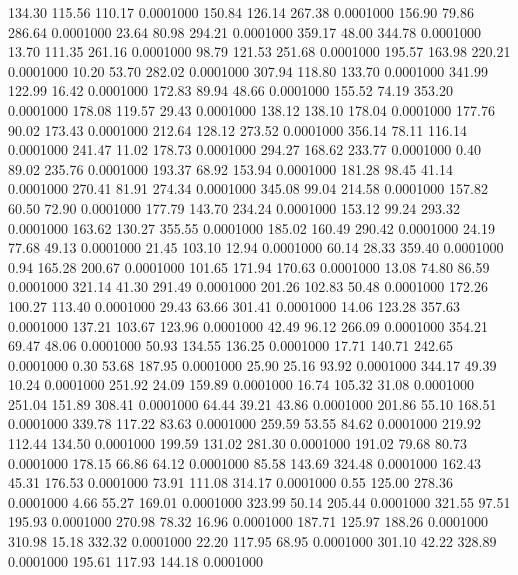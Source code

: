  134.30  115.56  110.17   0.0001000
 150.84  126.14  267.38   0.0001000
 156.90   79.86  286.64   0.0001000
  23.64   80.98  294.21   0.0001000
 359.17   48.00  344.78   0.0001000
  13.70  111.35  261.16   0.0001000
  98.79  121.53  251.68   0.0001000
 195.57  163.98  220.21   0.0001000
  10.20   53.70  282.02   0.0001000
 307.94  118.80  133.70   0.0001000
 341.99  122.99   16.42   0.0001000
 172.83   89.94   48.66   0.0001000
 155.52   74.19  353.20   0.0001000
 178.08  119.57   29.43   0.0001000
 138.12  138.10  178.04   0.0001000
 177.76   90.02  173.43   0.0001000
 212.64  128.12  273.52   0.0001000
 356.14   78.11  116.14   0.0001000
 241.47   11.02  178.73   0.0001000
 294.27  168.62  233.77   0.0001000
   0.40   89.02  235.76   0.0001000
 193.37   68.92  153.94   0.0001000
 181.28   98.45   41.14   0.0001000
 270.41   81.91  274.34   0.0001000
 345.08   99.04  214.58   0.0001000
 157.82   60.50   72.90   0.0001000
 177.79  143.70  234.24   0.0001000
 153.12   99.24  293.32   0.0001000
 163.62  130.27  355.55   0.0001000
 185.02  160.49  290.42   0.0001000
  24.19   77.68   49.13   0.0001000
  21.45  103.10   12.94   0.0001000
  60.14   28.33  359.40   0.0001000
   0.94  165.28  200.67   0.0001000
 101.65  171.94  170.63   0.0001000
  13.08   74.80   86.59   0.0001000
 321.14   41.30  291.49   0.0001000
 201.26  102.83   50.48   0.0001000
 172.26  100.27  113.40   0.0001000
  29.43   63.66  301.41   0.0001000
  14.06  123.28  357.63   0.0001000
 137.21  103.67  123.96   0.0001000
  42.49   96.12  266.09   0.0001000
 354.21   69.47   48.06   0.0001000
  50.93  134.55  136.25   0.0001000
  17.71  140.71  242.65   0.0001000
   0.30   53.68  187.95   0.0001000
  25.90   25.16   93.92   0.0001000
 344.17   49.39   10.24   0.0001000
 251.92   24.09  159.89   0.0001000
  16.74  105.32   31.08   0.0001000
 251.04  151.89  308.41   0.0001000
  64.44   39.21   43.86   0.0001000
 201.86   55.10  168.51   0.0001000
 339.78  117.22   83.63   0.0001000
 259.59   53.55   84.62   0.0001000
 219.92  112.44  134.50   0.0001000
 199.59  131.02  281.30   0.0001000
 191.02   79.68   80.73   0.0001000
 178.15   66.86   64.12   0.0001000
  85.58  143.69  324.48   0.0001000
 162.43   45.31  176.53   0.0001000
  73.91  111.08  314.17   0.0001000
   0.55  125.00  278.36   0.0001000
   4.66   55.27  169.01   0.0001000
 323.99   50.14  205.44   0.0001000
 321.55   97.51  195.93   0.0001000
 270.98   78.32   16.96   0.0001000
 187.71  125.97  188.26   0.0001000
 310.98   15.18  332.32   0.0001000
  22.20  117.95   68.95   0.0001000
 301.10   42.22  328.89   0.0001000
 195.61  117.93  144.18   0.0001000
